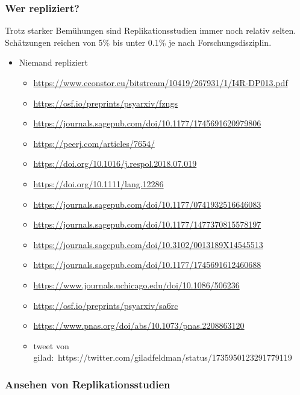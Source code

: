 \documentclass[
  letterpaper,
  DIV=11,
  numbers=noendperiod]{scrreprt}
\begin{document}
\subsubsection{Wer repliziert?}\label{wer-repliziert}

Trotz starker Bemühungen sind Replikationsstudien immer noch relativ
selten. Schätzungen reichen von 5\% bis unter 0.1\% je nach
Forschungsdisziplin.

\begin{itemize}
\item
  Niemand repliziert

  \begin{itemize}
  \item
    \url{https://www.econstor.eu/bitstream/10419/267931/1/I4R-DP013.pdf}
  \item
    \url{https://osf.io/preprints/psyarxiv/fzngs}
  \item
    \url{https://journals.sagepub.com/doi/10.1177/1745691620979806}
  \item
    \url{https://peerj.com/articles/7654/}
  \item
    \url{https://doi.org/10.1016/j.respol.2018.07.019}
  \item
    \url{https://doi.org/10.1111/lang.12286}
  \item
    \url{https://journals.sagepub.com/doi/10.1177/0741932516646083}
  \item
    \url{https://journals.sagepub.com/doi/10.1177/1477370815578197}
  \item
    \url{https://journals.sagepub.com/doi/10.3102/0013189X14545513}
  \item
    \url{https://journals.sagepub.com/doi/10.1177/1745691612460688}
  \item
    \url{https://www.journals.uchicago.edu/doi/10.1086/506236}
  \item
    \url{https://osf.io/preprints/psyarxiv/sa6rc}
  \item
    \url{https://www.pnas.org/doi/abs/10.1073/pnas.2208863120}
  \item
    tweet von
    gilad:~https://twitter.com/giladfeldman/status/1735950123291779119
  \end{itemize}
\end{itemize}

\subsubsection{Ansehen von
Replikationsstudien}\label{ansehen-von-replikationsstudien}
\end{document}
